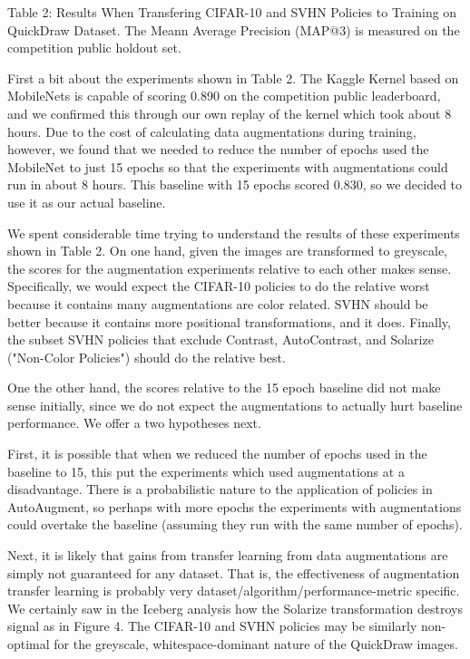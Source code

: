 \documentclass[10pt,twocolumn,letterpaper]{article}
\begin{document}
Table 2: Results When Transfering CIFAR-10 and SVHN Policies to Training on QuickDraw Dataset.  The Meann Average Precision (MAP@3) is measured on the competition public holdout set.

First a bit about the experiments shown in Table 2.  The Kaggle Kernel based on MobileNets is capable of scoring 0.890 on the competition public leaderboard, and we confirmed this through our own replay of the kernel which took about 8 hours.  Due to the cost of calculating data augmentations during training, however, we found that we needed to reduce the number of epochs used the MobileNet to just 15 epochs so that the experiments with augmentations could run in about 8 hours.  This baseline with 15 epochs scored 0.830, so we decided to use it as our actual baseline.

We spent considerable time trying to understand the results of these experiments shown in Table 2.  On one hand, given the images are transformed to greyscale, the scores for the augmentation experiments relative to each other makes sense.  Specifically, we would expect the CIFAR-10 policies to do the relative worst because it contains many augmentations are color related.  SVHN should be better because it contains more positional transformations, and it does.  Finally, the subset SVHN policies that exclude Contrast, AutoContrast, and Solarize ("Non-Color Policies") should do the relative best.

One the other hand, the scores relative to the 15 epoch baseline did not make sense initially, since we do not expect the augmentations to actually hurt baseline performance.  We offer a two hypotheses next.  

First, it is possible that when we reduced the number of epochs used in the baseline to 15, this put the experiments which used augmentations at a disadvantage. There is a probabilistic nature to the application of policies in AutoAugment, so perhaps with more epochs the experiments with augmentations could overtake the baseline (assuming they run with the same number of epochs).

Next, it is likely that gains from transfer learning from data augmentations are simply not guaranteed for any dataset.  That is, the effectiveness of augmentation transfer learning is probably very dataset/algorithm/performance-metric specific.  We certainly saw in the Iceberg analysis how the Solarize transformation destroys signal as in Figure 4.  The CIFAR-10 and SVHN policies may be similarly non-optimal for the greyscale, whitespace-dominant nature of the QuickDraw images.
\end{document}
